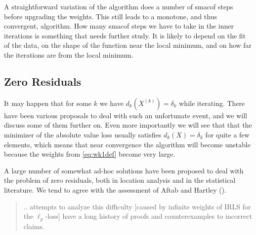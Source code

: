 \documentclass[
  12pt,
  letterpaper,
  DIV=11,
  numbers=noendperiod]{scrartcl}
\theoremstyle{plain}
\theoremstyle{plain}
\theoremstyle{plain}
\theoremstyle{definition}
\theoremstyle{remark}
\begin{document}
A straightforward variation of the algorithm does a number of smacof
steps before upgrading the weights. This still leads to a monotone, and
thus convergent, algorithm. How many smacof steps we have to take in the
inner iterations is something that needs further study. It is likely to
depend on the fit of the data, on the shape of the function near the
local minimum, and on how far the iterations are from the local minimum.

\subsection{Zero Residuals}\label{zero-residuals}

It may happen that for some \(k\) we have \(d_k(X^{(k)})=\delta_k\)
while iterating. There have been various proposals to deal with such an
unfortunate event, and we will discuss some of them further on. Even
more importantly we will see that that the minimizer of the absolute
value loss usually satisfies \(d_k(X)=\delta_k\) for quite a few
elements, which means that near convergence the algorithm will become
unstable because the weights from \eqref{eq:wk1def} become very large.

A large number of somewhat ad-hoc solutions have been proposed to deal
with the problem of zero residuals, both in location analysis and in the
statistical literature. We tend to agree with the assessment of Aftab
and Hartley ().

\begin{quote}
.. attempts to analyze this difficulty {[}caused by infinite weights of
IRLS for the \(\ell_p\)-loss{]} have a long history of proofs and
counterexamples to incorrect claims.
\end{quote}
\end{document}
